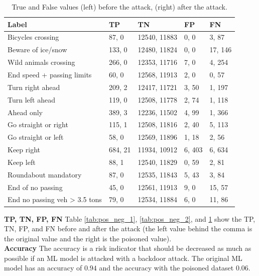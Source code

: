 \begin{table}[ht!]
\centering
  \begin{tabular}{| l | p{1.5cm} | p{2cm} | p{1.5cm} | p{1.5cm} |}
  \hline
  \rowcolor{lightgray} Label & TP & TN & FP & FN \\ [0.5ex]
  \hline
  Bicycles crossing & 87, 0 & 12540, 11883 & 0, 0 & 3, 87\\
  \hline
  Beware of ice/snow & 133, 0 & 12480, 11824 & 0, 0 & 17, 146\\
  \hline
  Wild animals crossing & 266, 0 & 12353, 11716 & 7, 0 & 4, 254\\
  \hline
  End speed + passing limits & 60, 0 & 12568, 11913 & 2, 0 & 0, 57\\
  \hline
  Turn right ahead & 209, 2 & 12417, 11721 & 3, 50 & 1, 197\\
  \hline
  Turn left ahead & 119, 0 & 12508, 11778 & 2, 74 & 1, 118\\
  \hline
  Ahead only & 389, 3 & 12236, 11502 & 4, 99 & 1, 366\\
  \hline
  Go straight or right & 115, 1 & 12508, 11816 & 2, 40 & 5, 113\\
  \hline
  Go straight or left & 58, 0 & 12569, 11896 & 1, 18 & 2, 56\\
  \hline
  Keep right & 684, 21 & 11934, 10912 & 6,  403 & 6, 634\\
  \hline
  Keep left & 88, 1 & 12540, 11829 & 0, 59 & 2, 81\\
  \hline
  Roundabout mandatory & 87, 0 & 12535, 11843 & 5, 43 & 3, 84\\
  \hline
  End of no passing & 45, 0 & 12561, 11913 & 9, 0 & 15, 57\\
  \hline
  End no passing veh > 3.5 tons & 79, 0 & 12534, 11884 & 6, 0 & 11, 86\\
  \hline
  \end{tabular}
  \caption{True and False values (left) before the attack, (right) after the attack.}
  \label{tab:pos_neg_3}
\end{table}

\noindent\textbf{TP, TN, FP, FN} Table \ref{tab:pos_neg_1}, \ref{tab:pos_neg_2}, and \ref{tab:pos_neg_3} show the TP, TN, FP, and FN before and after the attack (the left value behind the comma is the original value and the right is the poisoned value). \\

\noindent\textbf{Accuracy} The accuracy is a risk indicator that should be decreased as much as possible if an ML model is attacked with a backdoor attack. The original ML model has an accuracy of $0.94$ and the accuracy with the poisoned dataset $0.06$. \\

